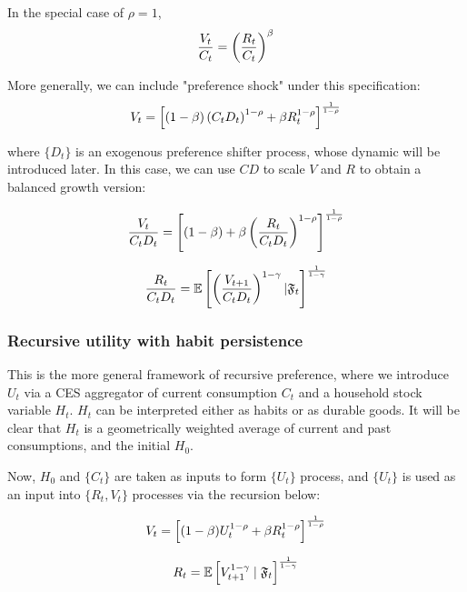 \documentclass{article}
\theoremstyle{exampstyle}
\begin{document}
In the special case of $\rho = 1$,
\begin{equation}\notag
\frac{V_t}{C_t} = \left(\frac{R_t}{C_t}\right)^{\beta}
\end{equation}

More generally, we can include "preference shock" under this specification:
\begin{equation}\notag
V_t = \left[(1-\beta)\left(C_t D_t \right)^{1-\rho}+\beta R_t^{1-\rho}\right]^{\frac{1}{1-\rho}}
\end{equation}

where $\{D_t\}$ is an exogenous preference shifter process, whose dynamic will be introduced later. In this case, we can use $CD$ to scale $V$ and $R$ to obtain a balanced growth version:

\begin{equation}\notag
\frac{V_t}{C_tD_t} = \left[(1-\beta)+\beta\left(\frac{R_t}{C_tD_t}\right)^{1-\rho}\right]^{\frac{1}{1-\rho}} 
\end{equation}

\begin{equation}\notag
\frac{R_t}{C_tD_t} = \mathbb{E}\left[\left(\frac{V_{t+1}}{C_tD_t}\right)^{1-\gamma} | {\mathfrak F}_t\right]^{\frac{1}{1-\gamma}}
\end{equation}

\subsubsection{Recursive utility with habit persistence}
This is the more general framework of recursive preference, where we introduce $U_t$ via a CES aggregator of current consumption $C_t$ and a household stock variable $H_t$. $H_t$ can be interpreted either as habits or as durable goods. It will be clear that $H_t$ is a geometrically weighted average of current and past consumptions, and the initial $H_0$. 

Now, $H_0$ and $\{C_t\}$ are taken as inputs to form $\{U_t\}$ process, and $\{U_t\}$ is used as an input into $\{R_t, V_t\}$ processes via the recursion below:

\begin{equation}\notag
V_t = \left[(1-\beta)U_t^{1-\rho}+\beta R_t^{1-\rho}\right]^{\frac{1}{1-\rho}}
\end{equation}

\begin{equation}\notag
R_t = \mathbb{E}\left[V_{t+1}^{1-\gamma} \mid {\mathfrak F}_t\right]^{\frac{1}{1-\gamma}}
\end{equation}
\end{document}
